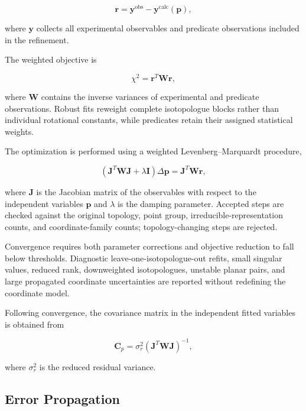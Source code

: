 \documentclass[aip,jcp,reprint,longbibliography,floatfix]{revtex4-2}
\begin{document}
\begin{equation}
\mathbf{r}
= \mathbf{y}^{\mathrm{obs}}
- \mathbf{y}^{\mathrm{calc}}(\mathbf{p}),
\end{equation}

where $\mathbf{y}$ collects all experimental observables and predicate
observations included in the refinement.

The weighted objective is

\begin{equation}
\chi^2
=
\mathbf{r}^{T}
\mathbf{W}
\mathbf{r},
\end{equation}

where $\mathbf{W}$ contains the inverse variances of experimental and predicate
observations. Robust fits reweight complete isotopologue blocks rather than
individual rotational constants, while predicates retain their assigned
statistical weights.

The optimization is performed using a weighted Levenberg--Marquardt procedure,

\begin{equation}
\left(
\mathbf{J}^{T}
\mathbf{W}
\mathbf{J}
+
\lambda \mathbf{I}
\right)
\Delta \mathbf{p}
=
\mathbf{J}^{T}
\mathbf{W}
\mathbf{r},
\label{eq:lm-step}
\end{equation}

where $\mathbf{J}$ is the Jacobian matrix of the observables with respect to
the independent variables $\mathbf{p}$ and $\lambda$ is the damping parameter.
Accepted steps are checked against the original topology, point group, 
irreducible-representation counts, and coordinate-family counts; topology-changing 
steps are rejected.

Convergence requires both parameter corrections and objective reduction to fall
below thresholds. Diagnostic leave-one-isotopologue-out refits, small singular
values, reduced rank, downweighted isotopologues, unstable planar pairs, and
large propagated coordinate uncertainties are reported without redefining the
coordinate model.

Following convergence, the covariance matrix in the independent fitted
variables is obtained from

\begin{equation}
\mathbf{C}_{p}
=
\sigma_r^2
\left(
\mathbf{J}^{T}
\mathbf{W}
\mathbf{J}
\right)^{-1},
\end{equation}

where $\sigma_r^2$ is the reduced residual variance.

\subsection{Error Propagation}
\end{document}
